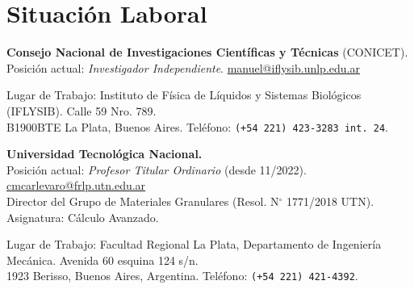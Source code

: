 \section*{Situación Laboral}

 \textbf{Consejo Nacional de Investigaciones Científicas y Técnicas} (CONICET). \\Posición actual: \textit{Investigador Independiente}. {\color{DimGrey}{\faEnvelope}} \href{mailto:manuel@iflysib.unlp.edu.ar}{manuel@iflysib.unlp.edu.ar}

Lugar de Trabajo: Instituto de Física de Líquidos y Sistemas Biológicos (IFLYSIB). Calle 59 Nro. 789.\\ B1900BTE  La Plata, Buenos Aires. Teléfono: \texttt{(+54 221) 423-3283 int. 24}.

   \textbf{Universidad Tecnológica Nacional.} \\
Posición actual: \textit{Profesor Titular Ordinario} (desde 11/2022). {\color{DimGrey}{\faEnvelope}}  \href{mailto:manuel@iflysib.unlp.edu.ar}{cmcarlevaro@frlp.utn.edu.ar} \\
Director del Grupo de Materiales Granulares (Resol. N$^\circ$ 1771/2018 UTN).\\
Asignatura: Cálculo Avanzado.

Lugar de Trabajo: Facultad Regional La Plata, Departamento de Ingeniería Mecánica. Avenida 60 esquina 124 s/n. \\1923 Berisso, Buenos Aires, Argentina. Teléfono: \texttt{(+54 221) 421-4392}.


% 
